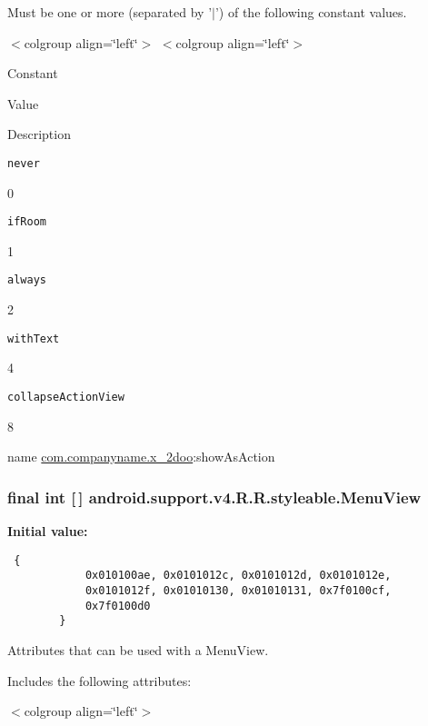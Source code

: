 Must be one or more (separated by '$|$') of the following constant values. \begin{TabularC}{0}
\hline
\end{TabularC}
$<$colgroup align=\char`\"{}left\char`\"{}$>$ $<$colgroup align=\char`\"{}left\char`\"{}$>$ 

Constant

Value

Description 

{\tt never}

0

{\tt ifRoom}

1

{\tt always}

2

{\tt withText}

4

{\tt collapseActionView}

8

name \hyperlink{namespacecom_1_1companyname_1_1x__2doo}{com.companyname.x\_\-2doo}:showAsAction \hypertarget{classandroid_1_1support_1_1v4_1_1_r_1_1styleable_f27b70b4d764f1a1f59531c58e843a3b}{
\subsubsection[{MenuView}]{\setlength{\rightskip}{0pt plus 5cm}final int \mbox{[}$\,$\mbox{]} android.support.v4.R.R.styleable.MenuView}}
\label{classandroid_1_1support_1_1v4_1_1_r_1_1styleable_f27b70b4d764f1a1f59531c58e843a3b}


\textbf{Initial value:}

\begin{Code}\begin{verbatim} {
            0x010100ae, 0x0101012c, 0x0101012d, 0x0101012e,
            0x0101012f, 0x01010130, 0x01010131, 0x7f0100cf,
            0x7f0100d0
        }
\end{verbatim}
\end{Code}
Attributes that can be used with a MenuView. 

Includes the following attributes: \begin{TabularC}{0}
\hline
\end{TabularC}
$<$colgroup align=\char`\"{}left\char`\"{}$>$ 

